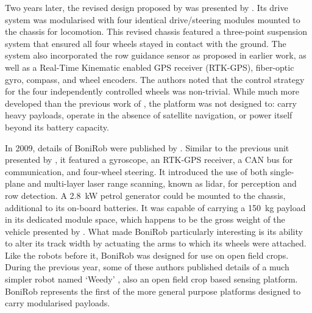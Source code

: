 \documentclass[preprint,authoryear,12pt]{elsarticle}
\begin{document}
        Two years later, the revised design proposed by \cite{Pedersen2002} was presented by \cite{Bak2004}.
        Its drive system was modularised with four identical drive/steering modules mounted to the chassis for locomotion.
        This revised chassis featured a three-point suspension system that ensured all four wheels stayed in contact with the ground.
        The system also incorporated the row guidance sensor as proposed in earlier work, as well as a Real-Time Kinematic enabled GPS receiver (RTK-GPS), fiber-optic gyro, compass, and wheel encoders.
        The authors noted that the control strategy for the four independently controlled wheels was non-trivial.
        While much more developed than the previous work of \cite{Pedersen2002}, the platform was not designed to: carry heavy payloads, operate in the absence of satellite navigation, or power itself beyond its battery capacity.


        In 2009, details of BoniRob were published by \cite{Ruckelshausen2009}.
        Similar to the previous unit presented by \cite{Bak2004}, it featured a gyroscope, an RTK-GPS receiver, a CAN bus for communication, and four-wheel steering.
        It introduced the use of both single-plane and multi-layer laser range scanning, known as lidar, for perception and row detection.
        A \SI{2.8}{\kilo\watt} petrol generator could be mounted to the chassis, additional to its on-board batteries.
        It was capable of carrying a \SI{150}{\kilo\gram} payload in its dedicated module space, which happens to be the gross weight of the vehicle presented by \cite{Bak2004}.
        What made BoniRob particularly interesting is its ability to alter its track width by actuating the arms to which its wheels were attached.
        Like the robots before it, BoniRob was designed for use on open field crops.
        During the previous year, some of these authors published details of a much simpler robot named `Weedy' \citep{Klose2008}, also an open field crop based sensing platform.
        BoniRob represents the first of the more general purpose platforms designed to carry modularised payloads.
\end{document}
